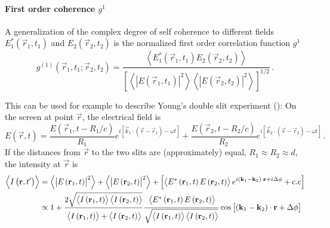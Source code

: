 \paragraph{First order coherence $g^1$}
A generalization of the complex degree of self coherence to different fields  $E_1^*(\vec{r}_1,t_1)$ and $E_2(\vec{r}_2,t_2)$ is the normalized first order correlation function $g^1$ \cite{agarwal2013}
\begin{equation}
	g^{(1)}(\vec{r}_1,t_1;\vec{r}_2,t_2)= \frac
	{\left< E_1^*(\vec{r}_1,t_1)E_2(\vec{r}_2,t_2) \right>}
	{\left[ \left<\left | E(\vec{r}_1,t_1)\right |^2 \right> \left< \left |E(\vec{r}_2,t_2)\right |^2 \right>\right]^{1/2}}	\,.
\end{equation}



This can be used for example to describe Young's double slit experiment (): On the screen at point $\vec{r}$, the electrical field is 
\begin{equation}
	E(\vec{r}, t)=\frac{E\left(\vec{r}_{1}, t-R_{1} / c\right)}{R_{1}} e^{i\left[\vec{k}_{1} \cdot\left(\vec{r}-\vec{r}_{1}\right)-\omega t\right]}+\frac{E\left(\vec{r}_{2}, t-R_{2} / c\right)}{R_{2}} e^{i\left[\vec{k}_{2} \cdot\left(\vec{r}-\vec{r}_{2}\right)-\omega t\right]} \,.
\end{equation}
If the distances from $\vec{r}$ to the two slits are (approximately) equal, $R_{1}\approx R_{2} \approx d$, the intensity at $\vec{r}$ is
\begin{align*}
	\left\langle I\left(\vec{r}, t^{\prime}\right)\right\rangle&=\left\langle\left|E\left(\vec{r}_{1}, t\right)\right|^{2}\right\rangle+\left\langle\left|E\left(\vec{r}_{2}, t\right)\right|^{2}\right\rangle 
	+\left[\left\langle E^{*}\left(\vec{r}_{1}, t\right) E\left(\vec{r}_{2}, t\right)\right\rangle e^{i\left(\vec{k}_{1}-\vec{k}_{2}\right) \cdot \vec{r}+i \Delta \phi}+\text{c.c}\right] \\
	& \propto 1+
	\frac{2 \sqrt{\left< I\left(\vec{r}_{1}, t\right)\right>\left< I\left(\vec{r}_{2}, t\right)\right>}}
	{\vphantom{2\sqrt{\left<I\left(\vec{r}_{1}\right)\right>}}\left< I\left(\vec{r}_{1}, t\right)\right>+\left< I\left(\vec{r}_{2}, t\right)\right>}	
	\frac{\vphantom{2\sqrt{\left<I\left(\vec{r}_{1}\right)\right>}}\left< E^{*}\left(\vec{r}_{1}, t\right) E\left(\vec{r}_{2}, t\right)\right>}
	{\vphantom{2\sqrt{\left<I\left(\vec{r}_{1}\right)\right>}}\sqrt{\left\langle I\left(\vec{r}_{1}, t\right)\right>\left\langle I\left(\vec{r}_{2}, t\right)\right>}}
	\cos \left[\left(\vec{k}_{1}-\vec{k}_{2}\right) \cdot \vec{r}+\Delta \phi\right]
\end{align*}


